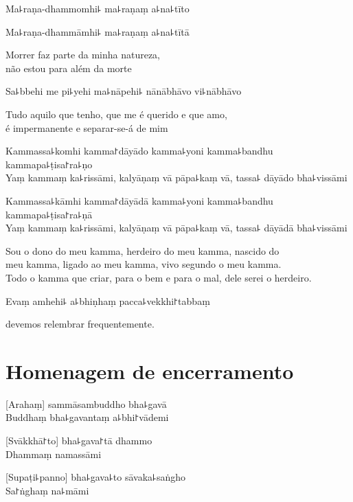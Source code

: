 \documentclass[
  babelLanguage=portuguese,
  final,
]{chantingbook}
\begin{document}
%
Ma꜕raṇa-dhammomhi꜕ ma꜕raṇaṃ a꜕na꜕tīto

%
Ma꜕raṇa-dhammāmhi꜕ ma꜕raṇaṃ a꜕na꜕tītā

\begin{english}
  Morrer faz parte da minha natureza,\\
  não estou para além da morte
\end{english}

Sa꜕bbehi me pi꜕yehi ma꜕nāpehi꜕ nānābhāvo vi꜕nābhāvo

\begin{english}
  Tudo aquilo que tenho, que me é querido e que amo,\\
  é impermanente e separar-se-á de mim
\end{english}

%
Kammassa꜕komhi kamma꜓dāyādo kamma꜕yoni kamma꜕bandhu kammapa꜕ṭisa꜓ra꜕ṇo\\
Yaṃ kammaṃ ka꜕rissāmi, kalyāṇaṃ vā pāpa꜕kaṃ vā, tassa꜕ dāyādo bha꜕vissāmi

\clearpage

%
Kammassa꜕kāmhi kamma꜓dāyādā kamma꜕yoni kamma꜕bandhu kammapa꜕ṭisa꜓ra꜕ṇā\\
Yaṃ kammaṃ ka꜕rissāmi, kalyāṇaṃ vā pāpa꜕kaṃ vā, tassa꜕ dāyādā bha꜕vissāmi

\begin{english}
  Sou o dono do meu kamma, herdeiro do meu kamma, nascido do\\
  meu kamma, ligado ao meu kamma, vivo segundo o meu kamma.\\
  Todo o kamma que criar, para o bem e para o mal, dele serei o herdeiro.
\end{english}

Evaṃ amhehi꜕ a꜕bhiṇhaṃ pacca꜕vekkhi꜓tabbaṃ

\begin{english}
   devemos relembrar frequentemente.
\end{english}

\artopttrue

\chapter{Homenagem de encerramento}

\delegateSetUseNext

[Arahaṃ] sammāsambuddho bha꜕gavā\\
Buddhaṃ bha꜕gavantaṃ a꜕bhi꜓vādemi

[Svākkhā꜓to] bha꜕gava꜓tā dhammo\\
Dhammaṃ namassāmi

[Supaṭi꜕panno] bha꜕gava꜕to sāvaka꜕saṅgho\\
Sa꜓ṅghaṃ na꜕māmi
\end{document}
